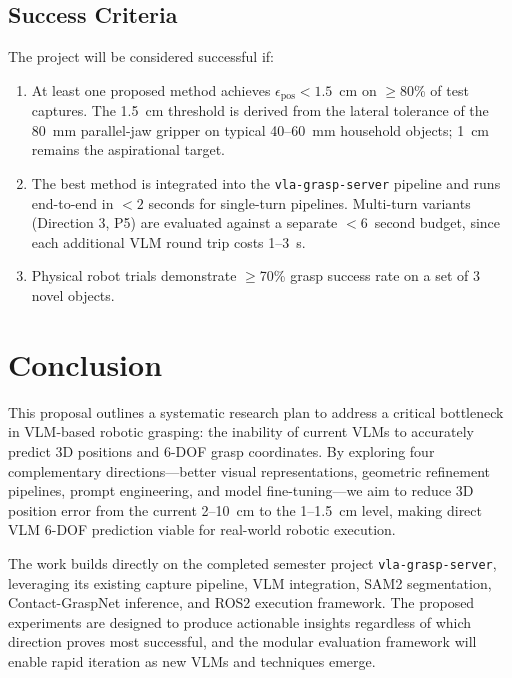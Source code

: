 \documentclass[11pt,a4paper]{article}
\begin{document}
\subsection{Success Criteria}
\label{sec:success}

The project will be considered successful if:
\begin{enumerate}[nosep]
    \item At least one proposed method achieves $\epsilon_{\text{pos}} < 1.5$~cm on $\geq$80\% of test captures. The 1.5~cm threshold is derived from the lateral tolerance of the 80~mm parallel-jaw gripper on typical 40--60~mm household objects; 1~cm remains the aspirational target.
    \item The best method is integrated into the \texttt{vla-grasp-server} pipeline and runs end-to-end in $<2$ seconds for single-turn pipelines. Multi-turn variants (Direction 3, P5) are evaluated against a separate $<6$~second budget, since each additional VLM round trip costs 1--3~s.
    \item Physical robot trials demonstrate $\geq$70\% grasp success rate on a set of 3 novel objects.
\end{enumerate}

\section{Conclusion}

This proposal outlines a systematic research plan to address a critical bottleneck in VLM-based robotic grasping: the inability of current VLMs to accurately predict 3D positions and 6-DOF grasp coordinates. By exploring four complementary directions---better visual representations, geometric refinement pipelines, prompt engineering, and model fine-tuning---we aim to reduce 3D position error from the current 2--10~cm to the 1--1.5~cm level, making direct VLM 6-DOF prediction viable for real-world robotic execution.

The work builds directly on the completed semester project \texttt{vla-grasp-server}, leveraging its existing capture pipeline, VLM integration, SAM2 segmentation, Contact-GraspNet inference, and ROS2 execution framework. The proposed experiments are designed to produce actionable insights regardless of which direction proves most successful, and the modular evaluation framework will enable rapid iteration as new VLMs and techniques emerge.
\end{document}
